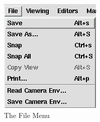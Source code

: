  \latexonly
 \begin{figure}[htp]
  \begin{center}
   \includegraphics[scale=0.7]{renderer/pict/image13}
   \caption{The File Menu}
	\label{fig59}
  \end{center}
 \end{figure}
 \endlatexonly

